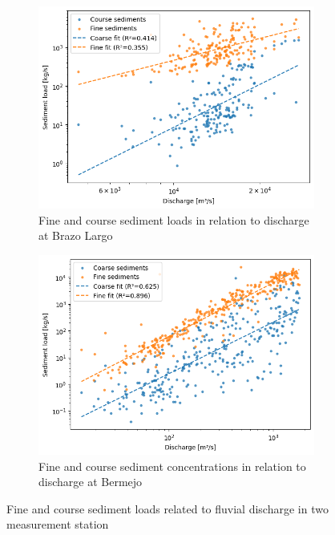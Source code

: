 \begin{figure}[h!]
    \centering
    \begin{subfigure}[b]{0.48\linewidth}
        \centering
        \includegraphics[width=\linewidth]{figures/ch5/discharge sediment brazo largo.png}
        \caption{Fine and course sediment loads in relation to discharge at Brazo Largo}
        \label{fig:discharge sediment brazo}
    \end{subfigure}
    \hfill
    \begin{subfigure}[b]{0.48\linewidth}
        \centering
        \includegraphics[width=\linewidth]{figures/ch5/discharge sediment bermejo.png}
        \caption{Fine and course sediment concentrations in relation to discharge at Bermejo}
        \label{fig:discharge sediment bermejo}
    \end{subfigure}
    
    \caption{Fine and course sediment loads related to fluvial discharge in two measurement station}
    \label{fig:sediment loads and discharge}
\end{figure}


